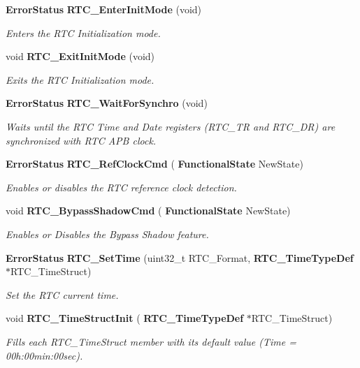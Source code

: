 \begin{DoxyCompactItemize}
\textbf{ Error\+Status} \textbf{ R\+T\+C\+\_\+\+Enter\+Init\+Mode} (void)
\begin{DoxyCompactList}\small\item\em Enters the R\+TC Initialization mode. \end{DoxyCompactList}\item 
void \textbf{ R\+T\+C\+\_\+\+Exit\+Init\+Mode} (void)
\begin{DoxyCompactList}\small\item\em Exits the R\+TC Initialization mode. \end{DoxyCompactList}\item 
\textbf{ Error\+Status} \textbf{ R\+T\+C\+\_\+\+Wait\+For\+Synchro} (void)
\begin{DoxyCompactList}\small\item\em Waits until the R\+TC Time and Date registers (R\+T\+C\+\_\+\+TR and R\+T\+C\+\_\+\+DR) are synchronized with R\+TC A\+PB clock. \end{DoxyCompactList}\item 
\textbf{ Error\+Status} \textbf{ R\+T\+C\+\_\+\+Ref\+Clock\+Cmd} (\textbf{ Functional\+State} New\+State)
\begin{DoxyCompactList}\small\item\em Enables or disables the R\+TC reference clock detection. \end{DoxyCompactList}\item 
void \textbf{ R\+T\+C\+\_\+\+Bypass\+Shadow\+Cmd} (\textbf{ Functional\+State} New\+State)
\begin{DoxyCompactList}\small\item\em Enables or Disables the Bypass Shadow feature. \end{DoxyCompactList}\item 
\textbf{ Error\+Status} \textbf{ R\+T\+C\+\_\+\+Set\+Time} (uint32\+\_\+t R\+T\+C\+\_\+\+Format, \textbf{ R\+T\+C\+\_\+\+Time\+Type\+Def} $\ast$R\+T\+C\+\_\+\+Time\+Struct)
\begin{DoxyCompactList}\small\item\em Set the R\+TC current time. \end{DoxyCompactList}\item 
void \textbf{ R\+T\+C\+\_\+\+Time\+Struct\+Init} (\textbf{ R\+T\+C\+\_\+\+Time\+Type\+Def} $\ast$R\+T\+C\+\_\+\+Time\+Struct)
\begin{DoxyCompactList}\small\item\em Fills each R\+T\+C\+\_\+\+Time\+Struct member with its default value (Time = 00h\+:00min\+:00sec). \end{DoxyCompactList}\item 

\end{DoxyCompactItemize}
